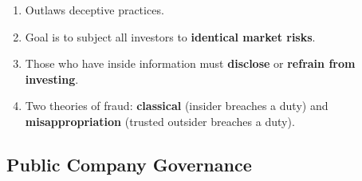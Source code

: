 \begin{enumerate}
\begin{enumerate}
\begin{enumerate}
            \item Outlaws deceptive practices.
            \item Goal is to subject all investors to \textbf{identical market 
            risks}.
            \item Those who have inside information must \textbf{disclose} or 
            \textbf{refrain from investing}.
            \item Two theories of fraud: \textbf{classical} (insider breaches 
            a duty) and \textbf{misappropriation} (trusted outsider breaches a 
            duty).
        \end{enumerate} 
    \end{enumerate}
\end{enumerate}

\newpage

\subsection{Public Company Governance}

